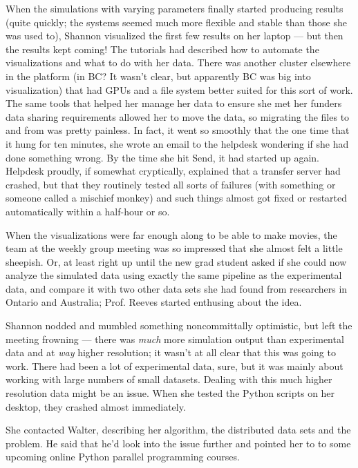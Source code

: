 \documentclass[11pt, letterpaper, twoside]{article}
\begin{document}
\begin{tcolorbox}[enhanced,breakable,colback=gray!15,colframe=cdaRed,parbox=false]
When the simulations with varying parameters finally started producing
results (quite quickly; the systems seemed much more flexible and stable
than those she was used to), Shannon visualized the first few results on
her laptop --- but then the results kept coming!  The tutorials had
described how to automate the visualizations and what to do with her
data. There was another cluster elsewhere in the platform (in BC? It
wasn't clear, but apparently BC was big into visualization) that had
GPUs and a file system better suited for this sort of work. The same
tools that helped her manage her data to ensure she met her funders data
sharing requirements allowed her to move the data, so migrating the
files to and from was pretty painless. In fact, it went so smoothly that
the one time that it hung for ten minutes, she wrote an email to the
helpdesk wondering if she had done something wrong. By the time she hit
Send, it had started up again.  Helpdesk proudly, if somewhat
cryptically, explained that a transfer server had crashed, but that they
routinely tested all sorts of failures (with something or someone called
a mischief monkey) and such things almost got fixed or restarted
automatically within a half-hour or so.

When the visualizations were far enough along to be able to make movies,
the team at the weekly group meeting was so impressed that she almost
felt a little sheepish. Or, at least right up until the new grad student
asked if she could now analyze the simulated data using exactly the same
pipeline as the experimental data, and compare it with two other data
sets she had found from researchers in Ontario and Australia; Prof.
Reeves started enthusing about the idea.

Shannon nodded and mumbled something noncommittally optimistic, but left
the meeting frowning --- there was \textit{much} more simulation output
than experimental data and at \textit{way} higher resolution; it wasn't
at all clear that this was going to work. There had been a lot of
experimental data, sure, but it was mainly about working with large
numbers of small datasets. Dealing with this much higher resolution data
might be an issue. When she tested the Python scripts on her desktop,
they crashed almost immediately.

She contacted Walter, describing her algorithm, the distributed data
sets and the problem. He said that he'd look into the issue further and
pointed her to to some upcoming online Python parallel programming
courses.


\end{tcolorbox}
\end{document}
